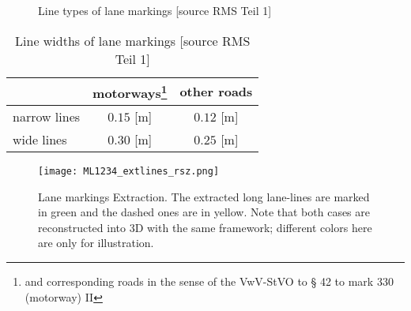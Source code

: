 \begin{figure}
\centering
{}
\quad
{}
\newline
{}
\quad
{}
\quad
{}
\caption{\small Line types of lane markings [source RMS Teil 1]}

\label{fig:LaneMarkingTypes}
\end{figure}
\setlength{\floatsep}{20pt plus 1.0pt minus 2.0pt}
\begin{table}
    \centering
    \begin{tabular}{l|cc}
    \toprule
           & motorways\footnote{and corresponding roads in the sense of the VwV-StVO to § 42 to mark 330 (motorway) II}  & other roads\\
    \midrule
    narrow lines & $0.15$ [m] & $0.12$ [m] \\
    wide lines   & $0.30$ [m] & $0.25$ [m] \\
    \bottomrule
    \end{tabular}
    \caption{\small Line widths of lane markings [source RMS Teil 1]}
    \label{tab:LaneMarkingWidths}
\end{table}


\begin{figure}
  \centering
  \texttt{[image: ML1234\_extlines\_rsz.png]}
  \caption{\small Lane markings Extraction. The extracted long lane-lines are marked in green and the dashed ones are in yellow.  Note that both cases are reconstructed into 3D with the same framework; different colors here are only for illustration.}
  \label{fig:LineExtraction}
\end{figure}



